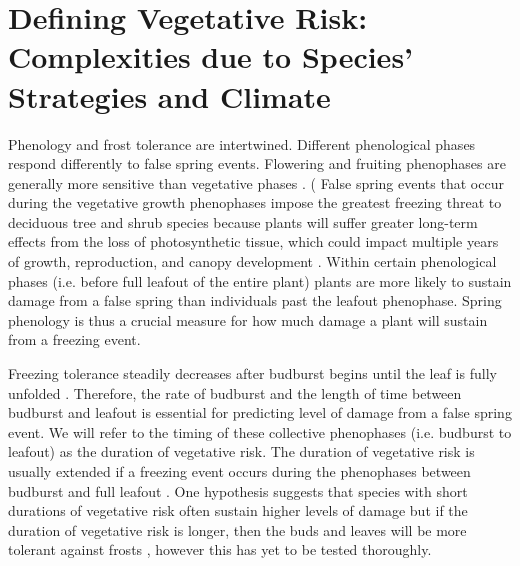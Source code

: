 \documentclass{article}\usepackage[]{graphicx}\usepackage[]{color}
\begin{document}
\section {Defining Vegetative Risk: Complexities due to Species' Strategies and Climate}
Phenology and frost tolerance are intertwined. Different phenological phases respond differently to false spring events. Flowering and fruiting phenophases are generally more sensitive than vegetative phases \citep{Augspurger2009, Lenz2013}. (%
False spring events that occur during the vegetative growth phenophases impose the greatest freezing threat to deciduous tree and shrub species because plants will suffer greater long-term effects from the loss of photosynthetic tissue, which could impact multiple years of growth, reproduction, and canopy development \citep{Sakai1987, Vitasse2014a}. Within certain phenological phases (i.e. before full leafout of the entire plant) plants are more likely to sustain damage from a false spring than individuals past the leafout phenophase. Spring phenology is thus a crucial measure for how much damage a plant will sustain from a freezing event.

Freezing tolerance steadily decreases after budburst begins until the leaf is fully unfolded \citep{Lenz2016}. Therefore, the rate of budburst and the length of time between budburst and leafout is essential for predicting level of damage from a false spring event. We will refer to the timing of these collective phenophases (i.e. budburst to leafout) as the duration of vegetative risk. The duration of vegetative risk is usually extended if a freezing event occurs during the phenophases between budburst and full leafout \citep{Augspurger2009}. One hypothesis suggests that species with short durations of vegetative risk often sustain higher levels of damage but if the duration of vegetative risk is longer, then the buds and leaves will be more tolerant against frosts \citep{Augspurger2009}, however this has yet to be tested thoroughly. 
\end{document}
